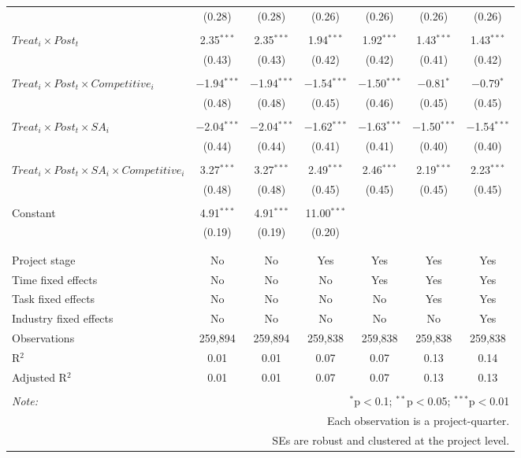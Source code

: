 \documentclass[
]{article}
\begin{document}
\begin{table}[H]
\begin{tabular}{@{\extracolsep{-3pt}}lcccccc}
  & (0.28) & (0.28) & (0.26) & (0.26) & (0.26) & (0.26) \\ 
  & & & & & & \\ 
 $Treat_i \times Post_t$ & 2.35$^{***}$ & 2.35$^{***}$ & 1.94$^{***}$ & 1.92$^{***}$ & 1.43$^{***}$ & 1.43$^{***}$ \\ 
  & (0.43) & (0.43) & (0.42) & (0.42) & (0.41) & (0.42) \\ 
  & & & & & & \\ 
 $Treat_i \times Post_t \times Competitive_i$ & $-$1.94$^{***}$ & $-$1.94$^{***}$ & $-$1.54$^{***}$ & $-$1.50$^{***}$ & $-$0.81$^{*}$ & $-$0.79$^{*}$ \\ 
  & (0.48) & (0.48) & (0.45) & (0.46) & (0.45) & (0.45) \\ 
  & & & & & & \\ 
 $Treat_i \times Post_t \times SA_i$ & $-$2.04$^{***}$ & $-$2.04$^{***}$ & $-$1.62$^{***}$ & $-$1.63$^{***}$ & $-$1.50$^{***}$ & $-$1.54$^{***}$ \\ 
  & (0.44) & (0.44) & (0.41) & (0.41) & (0.40) & (0.40) \\ 
  & & & & & & \\ 
 $Treat_i \times Post_t \times SA_i \times Competitive_i$ & 3.27$^{***}$ & 3.27$^{***}$ & 2.49$^{***}$ & 2.46$^{***}$ & 2.19$^{***}$ & 2.23$^{***}$ \\ 
  & (0.48) & (0.48) & (0.45) & (0.45) & (0.45) & (0.45) \\ 
  & & & & & & \\ 
 Constant & 4.91$^{***}$ & 4.91$^{***}$ & 11.00$^{***}$ &  &  &  \\ 
  & (0.19) & (0.19) & (0.20) &  &  &  \\ 
  & & & & & & \\ 
\hline \\[-1.8ex] 
Project stage & No & No & Yes & Yes & Yes & Yes \\ 
Time fixed effects & No & No & No & Yes & Yes & Yes \\ 
Task fixed effects & No & No & No & No & Yes & Yes \\ 
Industry fixed effects & No & No & No & No & No & Yes \\ 
Observations & 259,894 & 259,894 & 259,838 & 259,838 & 259,838 & 259,838 \\ 
R$^{2}$ & 0.01 & 0.01 & 0.07 & 0.07 & 0.13 & 0.14 \\ 
Adjusted R$^{2}$ & 0.01 & 0.01 & 0.07 & 0.07 & 0.13 & 0.13 \\ 
\hline 
\hline \\[-1.8ex] 
\textit{Note:}  & \multicolumn{6}{r}{$^{*}$p$<$0.1; $^{**}$p$<$0.05; $^{***}$p$<$0.01} \\ 
 & \multicolumn{6}{r}{Each observation is a project-quarter.} \\ 
 & \multicolumn{6}{r}{SEs are robust and clustered at the project level.} \\ 
\end{tabular} 
\end{table}
\end{document}
